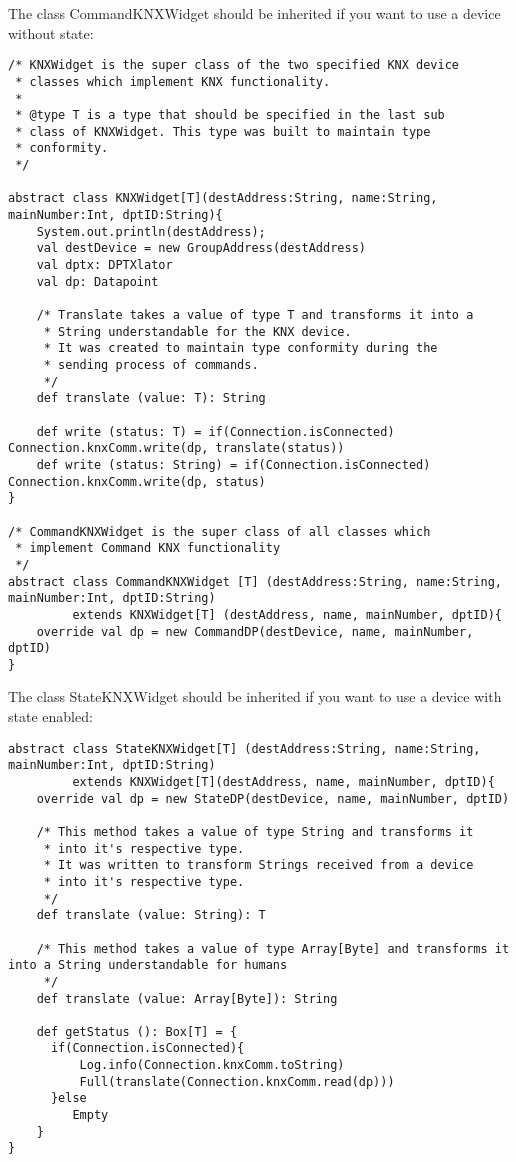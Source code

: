 The class CommandKNXWidget should be inherited if you want to use a device without state:
\begin{lstlisting}[caption=KNX command widget: Widget.scala,label=lst:h2h:commandknxwidget]
/* KNXWidget is the super class of the two specified KNX device
 * classes which implement KNX functionality.
 *
 * @type T is a type that should be specified in the last sub
 * class of KNXWidget. This type was built to maintain type
 * conformity.
 */

abstract class KNXWidget[T](destAddress:String, name:String, mainNumber:Int, dptID:String){
	System.out.println(destAddress);
    val destDevice = new GroupAddress(destAddress)
    val dptx: DPTXlator
    val dp: Datapoint

    /* Translate takes a value of type T and transforms it into a
     * String understandable for the KNX device.
     * It was created to maintain type conformity during the
     * sending process of commands.
     */
    def translate (value: T): String

	def write (status: T) = if(Connection.isConnected) Connection.knxComm.write(dp, translate(status))
	def write (status: String) = if(Connection.isConnected) Connection.knxComm.write(dp, status)
}

/* CommandKNXWidget is the super class of all classes which
 * implement Command KNX functionality
 */
abstract class CommandKNXWidget [T] (destAddress:String, name:String, mainNumber:Int, dptID:String)
		 extends KNXWidget[T] (destAddress, name, mainNumber, dptID){
    override val dp = new CommandDP(destDevice, name, mainNumber, dptID)
}
\end{lstlisting}

The class StateKNXWidget should be inherited if you want to use a device with state enabled:
\begin{lstlisting}[caption=KNX state widget: Widget.scala,label=lst:h2h:stateknxwidget]
abstract class StateKNXWidget[T] (destAddress:String, name:String, mainNumber:Int, dptID:String)
		 extends KNXWidget[T](destAddress, name, mainNumber, dptID){
    override val dp = new StateDP(destDevice, name, mainNumber, dptID)

    /* This method takes a value of type String and transforms it
     * into it's respective type.
     * It was written to transform Strings received from a device
     * into it's respective type.
     */
    def translate (value: String): T

    /* This method takes a value of type Array[Byte] and transforms it into a String understandable for humans
     */
    def translate (value: Array[Byte]): String

	def getStatus (): Box[T] = {
	  if(Connection.isConnected){
		  Log.info(Connection.knxComm.toString)
		  Full(translate(Connection.knxComm.read(dp)))
	  }else
         Empty
	}
}
\end{lstlisting}

